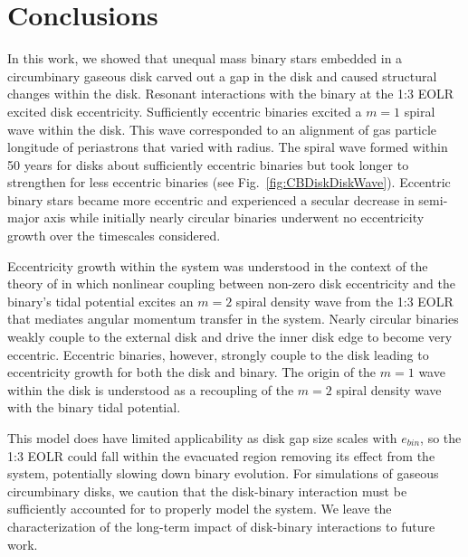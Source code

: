 \section{Conclusions}

In this work, we showed that unequal mass binary stars embedded in a circumbinary gaseous disk carved out a gap in the disk and caused structural changes 
within the disk.  Resonant interactions with the binary at the 1:3 EOLR excited disk eccentricity.  Sufficiently eccentric binaries excited a $m = 1$ spiral 
wave within the disk.  This wave corresponded to an alignment of gas particle longitude of periastrons that varied with radius.  The spiral wave formed within 50 
years for disks about sufficiently eccentric binaries but took longer to strengthen for less eccentric binaries (see Fig.~\ref{fig:CBDiskDiskWave}).  Eccentric binary stars 
became more eccentric and experienced a secular decrease in semi-major axis while initially nearly circular binaries underwent no eccentricity growth over the 
timescales considered.

Eccentricity growth within the system was understood in the context of the theory of \citet{Papaloizou2001} in which nonlinear coupling between non-zero disk 
eccentricity and the binary's tidal potential excites an $m = 2$ spiral density wave from the 1:3 EOLR that mediates angular momentum transfer in the system.  
Nearly circular binaries weakly couple to the external disk and drive the inner disk edge to become very eccentric.  Eccentric binaries, however, strongly couple 
to the disk leading to eccentricity growth for both the disk and binary.  The origin of the $m = 1$ wave within the disk is understood as a recoupling of the $m = 
2$ spiral density wave with the binary tidal potential.

This model does have limited applicability as disk gap size scales with $e_{bin}$, so the 1:3 EOLR could fall within the evacuated region removing its effect 
from the system, potentially slowing down binary evolution. For simulations of gaseous circumbinary disks, we caution that the disk-binary interaction must be 
sufficiently accounted for to properly model the system.  We leave the characterization of the long-term impact of disk-binary interactions to future work.

